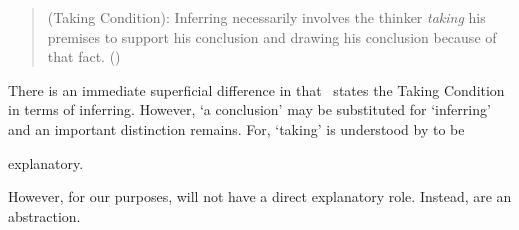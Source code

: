 \begin{note}
  \begin{quote}
    (Taking Condition):
    Inferring necessarily involves the thinker \emph{taking} his premises to support his conclusion and drawing his conclusion because of that fact.%
    \mbox{}\hfill\mbox{(\citeyear[5]{Boghossian:2014aa})}
  \end{quote}

  There is an immediate superficial difference in that~\citeauthor{Boghossian:2014aa} states the Taking Condition in terms of inferring.
  However, `a conclusion' may be substituted for `inferring' and an important distinction remains.
  For, `taking' is understood by \citeauthor{Boghossian:2014aa} to be {
    \color{red}
    explanatory.

    However, for our purposes,  will not have a direct explanatory role.
  Instead,  are an abstraction.
}
\end{note}


